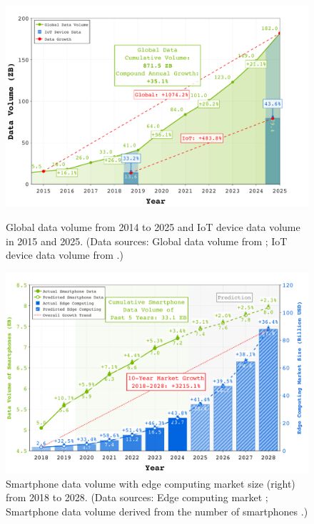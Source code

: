 \begin{figure}[htbp]
    \centering
    \begin{minipage}[t]{0.49\linewidth}
        \centering
        \includegraphics[width=\linewidth]{./figs/iot_data_contribution.pdf}
\vspace{-20pt}
        \caption{Global data volume from 2014 to 2025 and IoT device data volume in 2015 and 2025. (Data sources: Global data volume from \cite{statista_global_2023}; IoT device data volume from \cite{statista_iot_2023}.)}
    \label{fig:global_data}
    \end{minipage}
    \hfill
    \begin{minipage}[t]{0.49\linewidth}
        \centering
        \includegraphics[width=\linewidth]{./figs/edge_and_smartphone.pdf}
\vspace{-20pt}

        \caption{Smartphone data volume with edge computing market size (right) from 2018 to 2028. (Data sources: Edge computing market \cite{grandview_edge_2023}; Smartphone data volume derived from the number of smartphones \cite{bankmycell_smartphone_2023}.)}
    \label{fig:smartphone}
    \end{minipage}
    
\end{figure}


